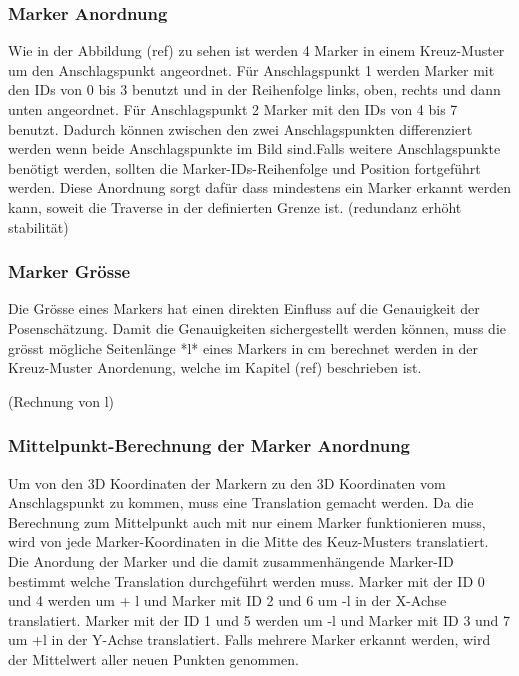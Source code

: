 \subsubsection{Marker Anordnung}

Wie in der Abbildung (ref) zu sehen ist werden 4 Marker in einem Kreuz-Muster um den Anschlagspunkt angeordnet. Für Anschlagspunkt 1 werden Marker mit den IDs von 0 bis 3 benutzt und in der Reihenfolge links, oben, rechts und dann unten angeordnet. Für Anschlagspunkt 2 Marker mit den IDs von 4 bis 7 benutzt. Dadurch können zwischen den zwei Anschlagspunkten differenziert werden wenn beide Anschlagspunkte im Bild sind.Falls weitere Anschlagspunkte benötigt werden, sollten die Marker-IDs-Reihenfolge und Position fortgeführt werden. Diese Anordnung sorgt dafür dass mindestens ein Marker erkannt werden kann, soweit die Traverse in der definierten Grenze ist. 
(redundanz erhöht stabilität)

\subsubsection{Marker Grösse}

Die Grösse eines Markers hat einen direkten Einfluss auf die Genauigkeit der Posenschätzung. Damit die Genauigkeiten sichergestellt werden können, muss die grösst mögliche Seitenlänge *l* eines Markers in cm berechnet werden in der Kreuz-Muster Anordenung, welche im Kapitel (ref) beschrieben ist.

(Rechnung von l)


\subsubsection{Mittelpunkt-Berechnung der Marker Anordnung}

Um von den 3D Koordinaten der Markern zu den 3D Koordinaten vom Anschlagspunkt zu kommen, muss eine Translation gemacht werden. Da die Berechnung zum Mittelpunkt auch mit nur einem Marker funktionieren muss, wird von jede Marker-Koordinaten in die Mitte des Keuz-Musters translatiert. Die Anordung der Marker und die damit zusammenhängende Marker-ID bestimmt welche Translation durchgeführt werden muss. Marker mit der ID 0 und 4 werden um + l und Marker mit ID 2 und 6 um -l in der X-Achse translatiert. Marker mit der ID 1 und 5 werden um -l und Marker mit ID 3 und 7 um +l in der Y-Achse translatiert. Falls mehrere Marker erkannt werden, wird der Mittelwert aller neuen Punkten genommen.

